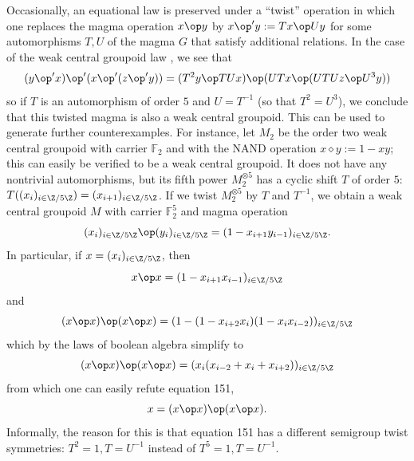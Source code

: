 Occasionally, an equational law is preserved under a ``twist'' operation in which one replaces the magma operation $x \op y$ by $x \op' y := Tx \op Uy$ for some automorphisms $T,U$ of the magma $G$ that satisfy additional relations.  In the case of the weak central groupoid law , we see that
$$
(y \op' x) \op' (x \op' (z \op' y))= (T^2 y \op TUx) \op (UTx \op (UTUz \op U^3y))$$
so if $T$ is an automorphism of order $5$ and $U = T^{-1}$ (so that $T^2 = U^3$), we conclude that this twisted magma is also a weak central groupoid.  This can be used to generate further counterexamples.  For instance, let $M_2$ be the order two weak central groupoid with carrier ${\mathbb F}_2$ and with the NAND operation $x \diamond y := 1 - xy$; this can easily be verified to be a weak central groupoid.  It does not have any nontrivial automorphisms, but its fifth power $M_2^{\otimes 5}$ has a cyclic shift $T$ of order $5$: $T( (x_i)_{i\in \Z/5\Z} ) = (x_{i+1})_{i \in \Z/5\Z}$.  If we twist $M_2^{\otimes 5}$ by $T$ and $T^{-1}$, we obtain a weak central groupoid $M$ with carrier ${\mathbb F}_2^5$ and magma operation
$$(x_i)_{i\in \Z/5\Z} \op (y_i)_{i\in \Z/5\Z} = (1 - x_{i+1} y_{i-1})_{i \in \Z/5\Z}.$$
In particular, if $x = (x_i)_{i\in \Z/5\Z}$, then
$$ x \op x = (1 - x_{i+1} x_{i-1})_{i \in \Z/5\Z}$$
and
$$ (x \op x) \op (x \op x) = (1 - (1 - x_{i+2} x_{i}) (1 - x_i x_{i-2}) )_{i \in \Z/5\Z}$$
which by the laws of boolean algebra simplify to
$$ (x \op x) \op (x \op x) = (x_i (x_{i-2} + x_i + x_{i+2}))_{i \in \Z/5\Z}$$
from which one can easily refute equation 151,
$$ x = (x \op x) \op (x \op x).$$
Informally, the reason for this is that equation 151 has a different semigroup twist symmetries: $T^2 = 1, T = U^{-1}$ instead of $T^5 = 1, T = U^{-1}$.


%

